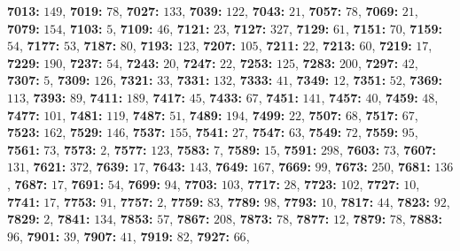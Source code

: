\textsf{\bfseries 7013:} $149$, \textsf{\bfseries 7019:} $78$, \textsf{\bfseries 7027:} $133$, \textsf{\bfseries 7039:} $122$, \textsf{\bfseries 7043:} $21$, \textsf{\bfseries 7057:} $78$, \textsf{\bfseries 7069:} $21$, \textsf{\bfseries 7079:} $154$, \textsf{\bfseries 7103:} $5$, \textsf{\bfseries 7109:} $46$, \textsf{\bfseries 7121:} $23$, \textsf{\bfseries 7127:} $327$, \textsf{\bfseries 7129:} $61$, \textsf{\bfseries 7151:} $70$, \textsf{\bfseries 7159:} $54$, \textsf{\bfseries 7177:} $53$, \textsf{\bfseries 7187:} $80$, \textsf{\bfseries 7193:} $123$, \textsf{\bfseries 7207:} $105$, \textsf{\bfseries 7211:} $22$, \textsf{\bfseries 7213:} $60$, \textsf{\bfseries 7219:} $17$, \textsf{\bfseries 7229:} $190$, \textsf{\bfseries 7237:} $54$, \textsf{\bfseries 7243:} $20$, \textsf{\bfseries 7247:} $22$, \textsf{\bfseries 7253:} $125$, \textsf{\bfseries 7283:} $200$, \textsf{\bfseries 7297:} $42$, \textsf{\bfseries 7307:} $5$, \textsf{\bfseries 7309:} $126$, \textsf{\bfseries 7321:} $33$, \textsf{\bfseries 7331:} $132$, \textsf{\bfseries 7333:} $41$, \textsf{\bfseries 7349:} $12$, \textsf{\bfseries 7351:} $52$, \textsf{\bfseries 7369:} $113$, \textsf{\bfseries 7393:} $89$, \textsf{\bfseries 7411:} $189$, \textsf{\bfseries 7417:} $45$, \textsf{\bfseries 7433:} $67$, \textsf{\bfseries 7451:} $141$, \textsf{\bfseries 7457:} $40$, \textsf{\bfseries 7459:} $48$, \textsf{\bfseries 7477:} $101$, \textsf{\bfseries 7481:} $119$, \textsf{\bfseries 7487:} $51$, \textsf{\bfseries 7489:} $194$, \textsf{\bfseries 7499:} $22$, \textsf{\bfseries 7507:} $68$, \textsf{\bfseries 7517:} $67$, \textsf{\bfseries 7523:} $162$, \textsf{\bfseries 7529:} $146$, \textsf{\bfseries 7537:} $155$, \textsf{\bfseries 7541:} $27$, \textsf{\bfseries 7547:} $63$, \textsf{\bfseries 7549:} $72$, \textsf{\bfseries 7559:} $95$, \textsf{\bfseries 7561:} $73$, \textsf{\bfseries 7573:} $2$, \textsf{\bfseries 7577:} $123$, \textsf{\bfseries 7583:} $7$, \textsf{\bfseries 7589:} $15$, \textsf{\bfseries 7591:} $298$, \textsf{\bfseries 7603:} $73$, \textsf{\bfseries 7607:} $131$, \textsf{\bfseries 7621:} $372$, \textsf{\bfseries 7639:} $17$, \textsf{\bfseries 7643:} $143$, \textsf{\bfseries 7649:} $167$, \textsf{\bfseries 7669:} $99$, \textsf{\bfseries 7673:} $250$, \textsf{\bfseries 7681:} $136$, \textsf{\bfseries 7687:} $17$, \textsf{\bfseries 7691:} $54$, \textsf{\bfseries 7699:} $94$, \textsf{\bfseries 7703:} $103$, \textsf{\bfseries 7717:} $28$, \textsf{\bfseries 7723:} $102$, \textsf{\bfseries 7727:} $10$, \textsf{\bfseries 7741:} $17$, \textsf{\bfseries 7753:} $91$, \textsf{\bfseries 7757:} $2$, \textsf{\bfseries 7759:} $83$, \textsf{\bfseries 7789:} $98$, \textsf{\bfseries 7793:} $10$, \textsf{\bfseries 7817:} $44$, \textsf{\bfseries 7823:} $92$, \textsf{\bfseries 7829:} $2$, \textsf{\bfseries 7841:} $134$, \textsf{\bfseries 7853:} $57$, \textsf{\bfseries 7867:} $208$, \textsf{\bfseries 7873:} $78$, \textsf{\bfseries 7877:} $12$, \textsf{\bfseries 7879:} $78$, \textsf{\bfseries 7883:} $96$, \textsf{\bfseries 7901:} $39$, \textsf{\bfseries 7907:} $41$, \textsf{\bfseries 7919:} $82$, \textsf{\bfseries 7927:} $66$, 
